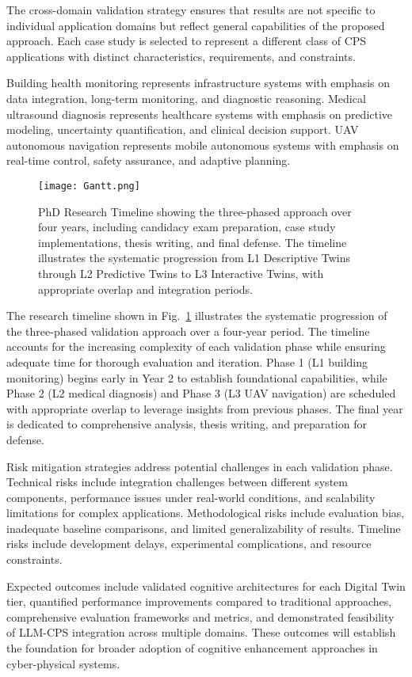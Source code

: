 The cross-domain validation strategy ensures that results are not specific to individual application domains but reflect general capabilities of the proposed approach. Each case study is selected to represent a different class of CPS applications with distinct characteristics, requirements, and constraints.

Building health monitoring represents infrastructure systems with emphasis on data integration, long-term monitoring, and diagnostic reasoning. Medical ultrasound diagnosis represents healthcare systems with emphasis on predictive modeling, uncertainty quantification, and clinical decision support. UAV autonomous navigation represents mobile autonomous systems with emphasis on real-time control, safety assurance, and adaptive planning.

\begin{figure}[htbp]
\centering
\texttt{[image: Gantt.png]}
\caption{PhD Research Timeline showing the three-phased approach over four years, including candidacy exam preparation, case study implementations, thesis writing, and final defense. The timeline illustrates the systematic progression from L1 Descriptive Twins through L2 Predictive Twins to L3 Interactive Twins, with appropriate overlap and integration periods.}
\label{fig:research_timeline}
\end{figure}

The research timeline shown in Fig.~\ref{fig:research_timeline} illustrates the systematic progression of the three-phased validation approach over a four-year period. The timeline accounts for the increasing complexity of each validation phase while ensuring adequate time for thorough evaluation and iteration. Phase 1 (L1 building monitoring) begins early in Year 2 to establish foundational capabilities, while Phase 2 (L2 medical diagnosis) and Phase 3 (L3 UAV navigation) are scheduled with appropriate overlap to leverage insights from previous phases. The final year is dedicated to comprehensive analysis, thesis writing, and preparation for defense.

Risk mitigation strategies address potential challenges in each validation phase. Technical risks include integration challenges between different system components, performance issues under real-world conditions, and scalability limitations for complex applications. Methodological risks include evaluation bias, inadequate baseline comparisons, and limited generalizability of results. Timeline risks include development delays, experimental complications, and resource constraints.

Expected outcomes include validated cognitive architectures for each Digital Twin tier, quantified performance improvements compared to traditional approaches, comprehensive evaluation frameworks and metrics, and demonstrated feasibility of LLM-CPS integration across multiple domains. These outcomes will establish the foundation for broader adoption of cognitive enhancement approaches in cyber-physical systems.

